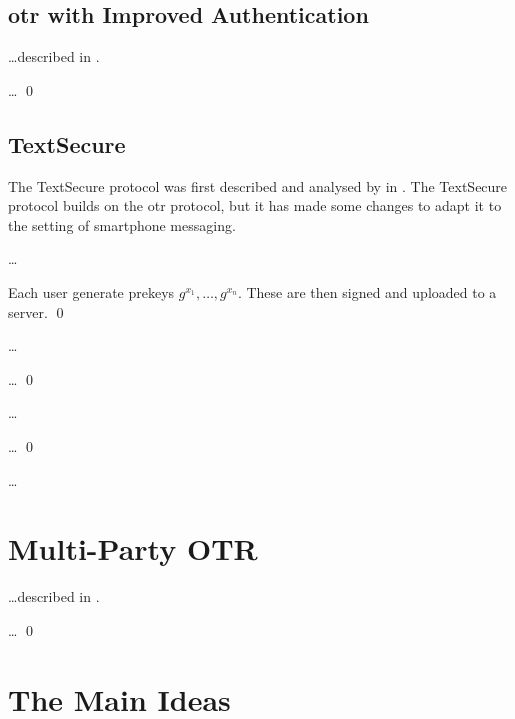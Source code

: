 \documentclass[draft]{llncs}
\begin{document}
\subsection{\acs{otr} with Improved Authentication}

\dots described in \cite{otr2007}.

\begin{protocol}
  \dots
  \qed
\end{protocol}

\subsection{TextSecure}

The TextSecure protocol was first described and analysed by 
\citeauthor{frosch2014secure} in \cite{frosch2014secure}.
The TextSecure protocol builds on the \ac{otr} protocol, but it has made some 
changes to adapt it to the setting of smartphone messaging.

\dots

\begin{protocol}
  Each user generate prekeys \(g^{x_1}, \ldots, g^{x_n}\).
  These are then signed and uploaded to a server.
  \qed
\end{protocol}

\dots

\begin{protocol}
  \dots
  \qed
\end{protocol}

\dots

\begin{protocol}
  \dots
  \qed
\end{protocol}

\dots


\section{Multi-Party \acs{OTR}}

\dots described in \cite{multiotr2009}.

\begin{protocol}
  \dots
  \qed
\end{protocol}


\section{The Main Ideas}
\end{document}
